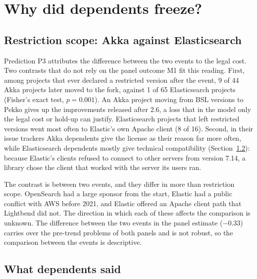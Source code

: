 \documentclass[11pt]{article}
\begin{document}
\section{Why did dependents freeze?}\label{sec:channels}

\subsection{Restriction scope: Akka against Elasticsearch}

Prediction P3 attributes the difference between the two events to the legal cost. Two contrasts that do not rely on the panel outcome M1 fit this reading. First, among projects that ever declared a restricted version after the event, 9 of 44 Akka projects later moved to the fork, against 1 of 65 Elasticsearch projects (Fisher's exact test, $p=0.001$). An Akka project moving from BSL versions to Pekko gives up the improvements released after 2.6, a loss that in the model only the legal cost or hold-up can justify. Elasticsearch projects that left restricted versions went most often to Elastic's own Apache client (8 of 16). Second, in their issue trackers Akka dependents give the license as their reason far more often, while Elasticsearch dependents mostly give technical compatibility (Section~\ref{sec:said}): because Elastic's clients refused to connect to other servers from version 7.14, a library chose the client that worked with the server its users ran.

The contrast is between two events, and they differ in more than restriction scope. OpenSearch had a large sponsor from the start, Elastic had a public conflict with AWS before 2021, and Elastic offered an Apache client path that Lightbend did not. The direction in which each of these affects the comparison is unknown. The difference between the two events in the panel estimate ($-0.33$) carries over the pre-trend problems of both panels and is not robust, so the comparison between the events is descriptive.

\subsection{What dependents said}\label{sec:said}
\end{document}
